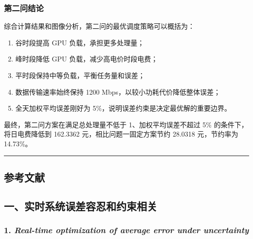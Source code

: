 \documentclass[
]{article}
\begin{document}
\subsubsection{第二问结论}\label{ux7b2cux4e8cux95eeux7ed3ux8bba}

综合计算结果和图像分析，第二问的最优调度策略可以概括为：

\begin{enumerate}
\def\labelenumi{\arabic{enumi}.}
\item
  谷时段提高 GPU 负载，承担更多处理量；
\item
  峰时段降低 GPU 负载，减少高电价时段电费；
\item
  平时段保持中等负载，平衡任务量和误差；
\item
  数据传输速率始终保持 1200 Mbps，以较小功耗代价降低整体误差；
\item
  全天加权平均误差刚好为 5\%，说明误差约束是决定最优解的重要边界。
\end{enumerate}

最终，第二问方案在满足总处理量不低于 1、加权平均误差不超过 5\%
的条件下，将日电费降低到 162.3362 元，相比问题一固定方案节约 28.0318
元，节约率为 14.73\%。

\begin{center}\rule{0.5\linewidth}{0.5pt}\end{center}

\subsection{参考文献}\label{ux53c2ux8003ux6587ux732e}

\subsection{一、实时系统误差容忍和约束相关}\label{ux4e00ux5b9eux65f6ux7cfbux7edfux8befux5deeux5bb9ux5fcdux548cux7ea6ux675fux76f8ux5173}

\subsubsection{\texorpdfstring{1. \emph{Real-time optimization of
average error under
uncertainty}}{1. Real-time optimization of average error under uncertainty}}\label{1-real-time-optimization-of-average-error-under-uncertainty}
\end{document}
